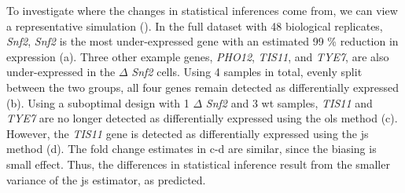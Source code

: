 
To investigate where the changes in statistical inferences come from, we can view a representative simulation ().
In the full dataset with 48 biological replicates, \emph{\emph{Snf2}}, \emph{Snf2} is the most under-expressed gene with an estimated 99 \% reduction in expression (a).
Three other example genes, \emph{PHO12}, \emph{TIS11}, and \emph{TYE7}, are also under-expressed in the $\Delta$ \emph{Snf2} cells.
Using 4 samples in total, evenly split between the two groups, all four genes remain detected as differentially expressed (b).
Using a suboptimal design with 1 $\Delta$ \emph{Snf2} and 3 \gls{wt} samples, \emph{TIS11} and \emph{TYE7} are no longer detected as differentially expressed using the \gls{ols} method (c).
However, the \emph{TIS11} gene is detected as differentially expressed using the \gls{js} method (d).
The fold change estimates in c-d are similar, since the biasing is small effect.
Thus, the differences in statistical inference result from the smaller variance of the \gls{js} estimator, as predicted.


